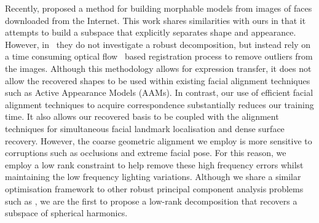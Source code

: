 Recently, \citet{KemelmacherShlizerman:2013iv} proposed a method for
building morphable models from images of faces downloaded from the Internet.
This work shares similarities with ours in that it attempts to build a subspace
that explicitly separates shape and appearance. However, in~\cite{KemelmacherShlizerman:2013iv}
they do not investigate a robust decomposition, but instead rely on a time
consuming optical flow~\cite{kemelmacher2012collection} based registration process to remove
outliers from the images. Although this methodology allows for expression
transfer, it does not allow the recovered shapes to be used within existing
facial alignment techniques such as Active Appearance Models (AAMs). In
contrast, our use of efficient facial alignment techniques to acquire
correspondence substantially reduces our training time. It also allows our
recovered basis to be coupled with the alignment techniques for simultaneous
facial landmark localisation and dense surface recovery. However, the coarse
geometric alignment we employ is more sensitive to corruptions such as
occlusions and extreme facial pose. For this reason, we employ a low rank
constraint
\cite{candes2011robust,peng2012rasl,sagonas2014raps,cheng2013rank,wu2010robust,lu2013uncalibrated}
to help remove these high frequency errors whilst maintaining the low frequency
lighting variations. Although we share a similar optimisation framework to other
robust principal component analysis problems such as
\cite{candes2011robust,peng2012rasl,wu2010robust,lu2013uncalibrated}, we are the first to propose
a low-rank decomposition that recovers a subspace of spherical harmonics.
